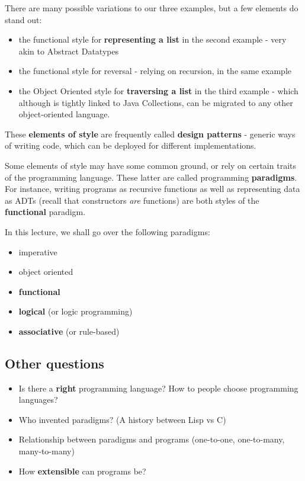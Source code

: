 There are many possible variations to our three examples, but a few elements do stand out:
\begin{itemize}
	\item  the functional style for \textbf{representing a list} in the second example - very akin to Abstract Datatypes
	\item  the functional style for reversal - relying on recursion, in the same example
	\item  the Object Oriented style for \textbf{traversing a list} in the third example - which although is tightly linked to Java Collections, can be migrated to any other object-oriented language.
\end{itemize}

These \textbf{elements of style} are frequently called \textbf{design patterns} - generic ways of writing code, which can be deployed for different implementations. 

Some elements of style may have some common ground, or rely on certain traits of the programming language. These latter are called programming \textbf{paradigms}. For instance, writing programs as recursive functions as well as representing data as ADTs (recall that constructors \textit{are} functions) are both styles of the \textbf{functional} paradigm.

In this lecture, we shall go over the following paradigms:
\begin{itemize}
	\item  imperative
	\item  object oriented
	\item  \textbf{functional}
	\item  \textbf{logical} (or logic programming)
	\item  \textbf{associative} (or rule-based)
\end{itemize}

\subsection*{ Other questions }

\begin{itemize}
	\item  Is there a \textbf{right} programming language? How to people choose programming languages?
	\item  Who invented paradigms? (A history between Lisp vs C)
	\item  Relationship between paradigms and programs (one-to-one, one-to-many, many-to-many)
	\item  How \textbf{extensible} can programs be?
\end{itemize}

